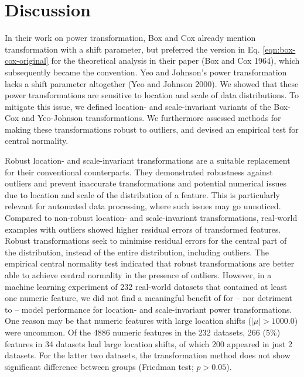 \documentclass[
  a4paper,
]{article}
\begin{document}
\section{Discussion}\label{discussion}

In their work on power transformation, Box and Cox already mention
transformation with a shift parameter, but preferred the version in Eq.
\ref{eqn:box-cox-original} for the theoretical analysis in their paper
(Box and Cox 1964), which subsequently became the convention. Yeo and
Johnson's power transformation lacks a shift parameter altogether (Yeo
and Johnson 2000). We showed that these power transformations are
sensitive to location and scale of data distributions. To mitigate this
issue, we defined location- and scale-invariant variants of the Box-Cox
and Yeo-Johnson transformations. We furthermore assessed methods for
making these transformations robust to outliers, and devised an
empirical test for central normality.

Robust location- and scale-invariant transformations are a suitable
replacement for their conventional counterparts. They demonstrated
robustness against outliers and prevent inaccurate transformations and
potential numerical issues due to location and scale of the distribution
of a feature. This is particularly relevant for automated data
processing, where such issues may go unnoticed. Compared to non-robust
location- and scale-invariant transformations, real-world examples with
outliers showed higher residual errors of transformed features. Robust
transformations seek to minimise residual errors for the central part of
the distribution, instead of the entire distribution, including
outliers. The empirical central normality test indicated that robust
transformations are better able to achieve central normality in the
presence of outliers. However, in a machine learning experiment of 232
real-world datasets that contained at least one numeric feature, we did
not find a meaningful benefit of for -- nor detriment to -- model
performance for location- and scale-invariant power transformations. One
reason may be that numeric features with large location shifts
(\(|\mu| > 1000.0\)) were uncommon. Of the 4886 numeric features in the
232 datasets, 266 (5\%) features in 34 datasets had large location
shifts, of which 200 appeared in just 2 datasets. For the latter two
datasets, the transformation method does not show significant difference
between groups (Friedman test; \(p > 0.05\)).
\end{document}
